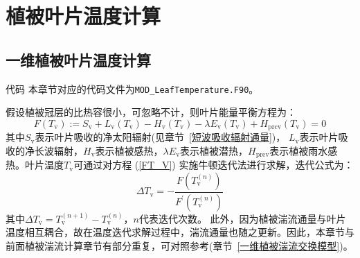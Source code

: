 \chapter{植被叶片温度计算}\label{植被叶片温度计算}
\section{一维植被叶片温度计算}\label{一维植被温度计算}

\begin{mymdframed}{代码}
  本章节对应的代码文件为\texttt{MOD\_LeafTemperature.F90}。
\end{mymdframed}

假设植被冠层的比热容很小，可忽略不计，则叶片能量平衡方程为：
\begin{equation}\label{FT_V}
  F\left(T_{\mathrm{v}}\right):=S_{\mathrm{v}}+L_{\mathrm{v}}\left(T_{\mathrm{v}}\right)-H_{\mathrm{v}}\left(T_{\mathrm{v}}\right)-\lambda E_{\mathrm{v}}\left(T_{\mathrm{v}}\right)+H_{\mathrm{p r c v}}\left(T_{\mathrm{v}}\right)=0
\end{equation}
其中$S_{\mathrm v}$表示叶片吸收的净太阳辐射(见章节~\ref{短波吸收辐射通量})，
$L_{\mathrm v}$表示叶片吸收的净长波辐射，$H_{\mathrm v}$表示植被感热，$\lambda E_{\mathrm v}$表示植被潜热，$H_{\mathrm{prev}}$表示植被雨水感热。叶片温度$T_{\mathrm v}$可通过对方程 (\ref{FT_V}) 实施牛顿迭代法进行求解，迭代公式为：
\begin{equation}
  \Delta T_{\mathrm{v}}=-\frac{F\left(T_{\mathrm{v}}^{(n)}\right)}{F^{\prime}\left(T_{\mathrm{v}}^{(n)}\right)}
\end{equation}
其中$\Delta T_{\mathrm v}=T_{\mathrm v}^{\left(n+1\right)}-T_{\mathrm v}^{\left(n\right)}$，$n$代表迭代次数。
此外，因为植被湍流通量与叶片温度相互耦合，故在温度迭代求解过程中，湍流通量也随之更新。因此，本章节与前面植被湍流计算章节有部分重复，可对照参考(章节~\ref{一维植被湍流交换模型})。

